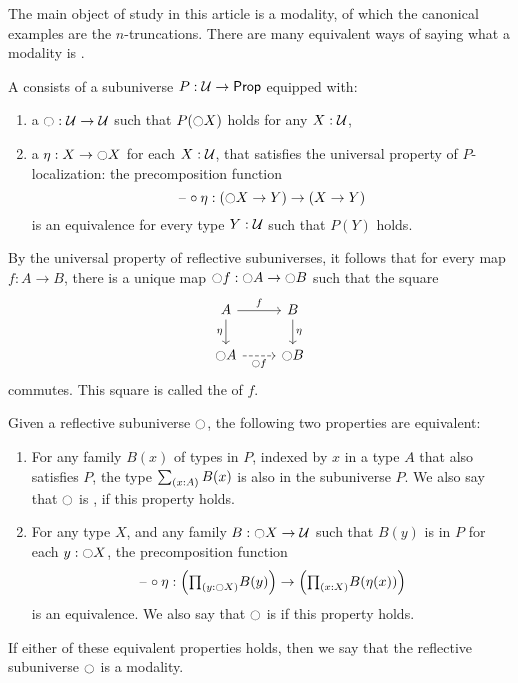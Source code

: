 \documentclass[9pt,twosided]{amsart}
\begin{document}
The main object of study in this article is a modality, of which the canonical examples are the $n$-truncations. There are many equivalent ways of saying what a modality is \cite{RijkeSpittersShulman}.

\begin{defn}
  A  consists of a subuniverse $P:\mathcal{U}\to\mathsf{Prop}$ equipped with:
  \begin{enumerate}
  \item a  ${\ocircle} :\mathcal{U}\to\mathcal{U}$ such that $P({\ocircle} X)$ holds for any $X:\mathcal{U}$,
  \item a  $\eta:X\to{\ensuremath{\ocircle}} X$ for each $X:\mathcal{U}$, that satisfies the universal property of $P$-localization: the precomposition function
    \begin{equation*}
      \mathord{\hspace{1pt}\text{--}\hspace{1pt}}\circ\eta : ({\ocircle} X\to Y)\to (X\to Y)
    \end{equation*}
    is an equivalence for every type $Y:\mathcal{U}$ such that $P(Y)$ holds.
  \end{enumerate}
\end{defn}

By the universal property of reflective subuniverses, it follows that for every map $f:A\to B$, there is a unique map ${\ocircle} f : {\ocircle} A \to {\ensuremath{\ocircle}} B$ such that the square
\begin{equation*}
  \begin{tikzcd}
    A \arrow[d,swap,"\eta"] \arrow[r,"f"] & B \arrow[d,"\eta"] \\
    \modal A \arrow[r,dashed,swap,"\modal f"] & \modal B
  \end{tikzcd}
\end{equation*}
commutes. This square is called the  of $f$.

\begin{prp}\label{prp:modality}
  Given a reflective subuniverse ${\ocircle}$, the following two properties are equivalent:
  \begin{enumerate}
  \item For any family $B(x)$ of types in $P$, indexed by $x$ in a type $A$ that also satisfies $P$, the type $\sm{x:A}B(x)$ is also in the subuniverse $P$. We also say that ${\ocircle}$ is , if this property holds.
  \item For any type $X$, and any family $B:{\ocircle} X\to\mathcal{U}$ such that $B(y)$ is in $P$ for each $y:{\ocircle} X$, the precomposition function
    \begin{equation*}
      \blank\circ\eta : \Big(\prd{y:\modal X}B(y)\Big)\to\Big(\prd{x:X}B(\eta(x))\Big)
    \end{equation*}
    is an equivalence. We also say that ${\ocircle}$ is  if this property holds.
  \end{enumerate}
  If either of these equivalent properties holds, then we say that the reflective subuniverse ${\ocircle}$ is a modality.
\end{prp}
\end{document}
